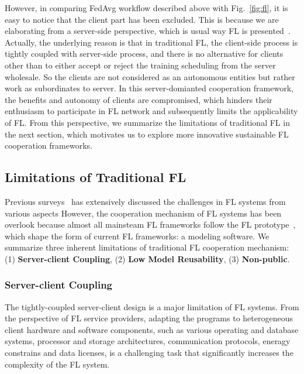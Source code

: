 However, in comparing FedAvg workflow described above with Fig.~\ref{fig:fl}, it is easy to notice that the client part has been excluded.
This is because we are elaborating from a server-side perspective, which is usual way FL is presented~\cite{mcmahan2017communication, li2020ditto, caldas2018leaf}.
Actually, the underlying reason is that in traditional FL, the client-side process is tightly coupled with server-side process, and there is no alternative for clients other than to either accept or reject the training scheduling from the server wholesale.
So the clients are not considered as an autonomous entities but rather work as subordinates to server.
In this server-domianted cooperation framework, the benefits and autonomy of clients are compromised, which hinders their enthusiasm to participate in FL network and subsequently limits the applicability of FL.
From this perspective, we summarize the limitations of traditional FL in the next section, which motivates us to explore more innovative sustainable FL cooperation frameworks.

\subsection{Limitations of Traditional FL}
Previous surveys~\cite{kairouz2021advances, zhang2022federated, alazab2021federated, nguyen2021federated, zhu2022blockchain, li2020federated, yang2019federated, tan2022towards} has extensively discussed the challenges in FL systems from various aspects
However, the cooperation mechanism of FL systems has been overlook because almost all mainsteam FL frameworks follow the FL prototype~\cite{mcmahan2017communication}, which shape the form of current FL frameworks: a modeling software.
We summarize three inherent limitations of traditional FL cooperation mechanism: (1) \textbf{Server-client Coupling}, (2) \textbf{Low Model Reusability}, (3) \textbf{Non-public}.

\subsubsection{Server-client Coupling} 
The tightly-coupled server-client design is a major limitation of FL systems. From the perspective of FL service providers, adapting the programs to heterogeneous client hardware and software components, such as various operating and database systems, processor and storage architectures, communication protocols, eneragy constrains and data licenses, is a challenging task that significantly increases the complexity of the FL system. 
    
